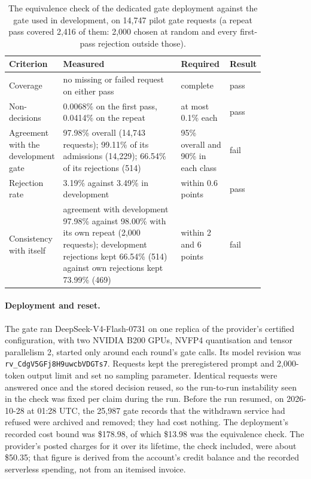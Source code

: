 \begin{table}[h]
\centering
\caption{Decisions of the development gate (rows) and of the dedicated deployment's first pass (columns) on the same
pilot gate requests.}
\label{tab:equivdecisions}
\small

\end{table}

\begin{table}[h]
\centering
\caption{The equivalence check of the dedicated gate deployment against the gate used in development, on 14,747
pilot gate requests (a repeat pass covered 2,416 of them: 2,000 chosen at random and every first-pass rejection
outside those).}
\label{tab:equiv}
\footnotesize
\setlength{\tabcolsep}{4pt}
\begin{tabular}{@{}p{0.2\linewidth}p{0.46\linewidth}p{0.19\linewidth}l@{}}
\toprule
Criterion & Measured & Required & Result \\
\midrule
Coverage & no missing or failed request on either pass & complete & pass \\
Non-decisions & 0.0068\% on the first pass, 0.0414\% on the repeat & at most 0.1\% each & pass \\
Agreement with the development gate & 97.98\% overall (14,743 requests); 99.11\% of its admissions (14,229); 66.54\%
of its rejections (514) & 95\% overall and 90\% in each class & fail \\
Rejection rate & 3.19\% against 3.49\% in development & within 0.6 points & pass \\
Consistency with itself & agreement with development 97.98\% against 98.00\% with its own repeat (2,000 requests);
development rejections kept 66.54\% (514) against own rejections kept 73.99\% (469) & within 2 and 6 points & fail \\
\bottomrule
\end{tabular}
\end{table}

\paragraph{Deployment and reset.} The gate ran DeepSeek-V4-Flash-0731 on one replica of the provider's certified
configuration, with two NVIDIA B200 GPUs, NVFP4 quantisation and tensor parallelism 2, started only around each
round's gate calls. Its model revision was \texttt{rv\_CdgV5GFj8H9uwcbVDGTs7}. Requests kept the preregistered prompt
and 2,000-token output limit and set no sampling parameter. Identical requests were answered once and the stored
decision reused, so the run-to-run instability seen in the check was fixed per claim during the run. Before the run resumed, on 2026-10-28 at 01:28 UTC, the 25,987 gate records that the withdrawn
service had refused were archived and removed; they had cost nothing. The deployment's recorded cost bound was
\$178.98, of which \$13.98 was the equivalence check. The provider's posted charges for it over its lifetime, the
check included, were about \$50.35; that figure is derived from the account's credit balance and the recorded
serverless spending, not from an itemised invoice.

